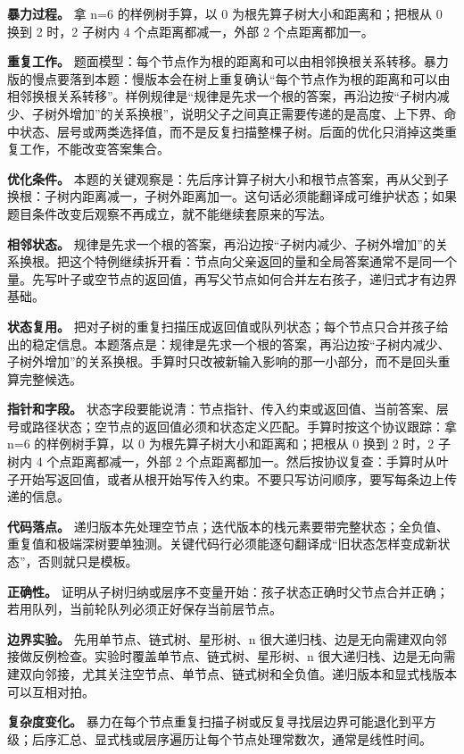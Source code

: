 \textbf{暴力过程。} 拿 n=6 的样例树手算，以 0 为根先算子树大小和距离和；把根从 0 换到 2 时，2 子树内 4 个点距离都减一，外部 2 个点距离都加一。

\textbf{重复工作。} 题面模型：每个节点作为根的距离和可以由相邻换根关系转移。暴力版的慢点要落到本题：慢版本会在树上重复确认“每个节点作为根的距离和可以由相邻换根关系转移”。样例规律是“规律是先求一个根的答案，再沿边按“子树内减少、子树外增加”的关系换根”，说明父子之间真正需要传递的是高度、上下界、命中状态、层号或两类选择值，而不是反复扫描整棵子树。后面的优化只消掉这类重复工作，不能改变答案集合。

\textbf{优化条件。} 本题的关键观察是：先后序计算子树大小和根节点答案，再从父到子换根：子树内距离减一，子树外距离加一。这句话必须能翻译成可维护状态；如果题目条件改变后观察不再成立，就不能继续套原来的写法。

\textbf{相邻状态。} 规律是先求一个根的答案，再沿边按“子树内减少、子树外增加”的关系换根。把这个特例继续拆开看：节点向父亲返回的量和全局答案通常不是同一个量。先写叶子或空节点的返回值，再写父节点如何合并左右孩子，递归式才有边界基础。

\textbf{状态复用。} 把对子树的重复扫描压成返回值或队列状态；每个节点只合并孩子给出的稳定信息。本题落点是：规律是先求一个根的答案，再沿边按“子树内减少、子树外增加”的关系换根。手算时只改被新输入影响的那一小部分，而不是回头重算完整候选。

\textbf{指针和字段。} 状态字段要能说清：节点指针、传入约束或返回值、当前答案、层号或路径状态；空节点的返回值必须和状态定义匹配。手算时按这个协议跟踪：拿 n=6 的样例树手算，以 0 为根先算子树大小和距离和；把根从 0 换到 2 时，2 子树内 4 个点距离都减一，外部 2 个点距离都加一。然后按协议复查：手算时从叶子开始写返回值，或者从根开始写传入约束。不要只写访问顺序，要写每条边上传递的信息。

\textbf{代码落点。} 递归版本先处理空节点；迭代版本的栈元素要带完整状态；全负值、重复值和极端深树要单独测。关键代码行必须能逐句翻译成“旧状态怎样变成新状态”，否则就只是模板。

\textbf{正确性。} 证明从子树归纳或层序不变量开始：孩子状态正确时父节点合并正确；若用队列，当前轮队列必须正好保存当前层节点。

\textbf{边界实验。} 先用单节点、链式树、星形树、n 很大递归栈、边是无向需建双向邻接做反例检查。实验时覆盖单节点、链式树、星形树、n 很大递归栈、边是无向需建双向邻接，尤其关注空节点、单节点、链式树和全负值。递归版本和显式栈版本可以互相对拍。

\textbf{复杂度变化。} 暴力在每个节点重复扫描子树或反复寻找层边界可能退化到平方级；后序汇总、显式栈或层序遍历让每个节点处理常数次，通常是线性时间。

